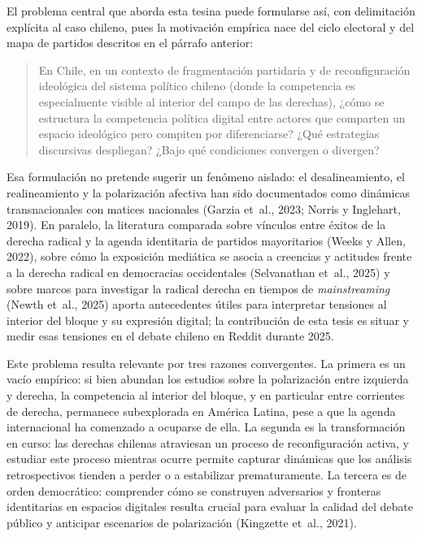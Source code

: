 \documentclass[
  letterpaper,
  numbers=noendperiod,
  fontsize=11pt,
  DIV=12,
  titlepage=false]{scrreprt}
\begin{document}
El problema central que aborda esta tesina puede formularse así, con
delimitación explícita al caso chileno, pues la motivación empírica nace
del ciclo electoral y del mapa de partidos descritos en el párrafo
anterior:

\begin{quote}
En Chile, en un contexto de fragmentación partidaria y de
reconfiguración ideológica del sistema político chileno (donde la
competencia es especialmente visible al interior del campo de las
derechas), ¿cómo se estructura la competencia política digital entre
actores que comparten un espacio ideológico pero compiten por
diferenciarse? ¿Qué estrategias discursivas despliegan? ¿Bajo qué
condiciones convergen o divergen?
\end{quote}

Esa formulación no pretende sugerir un fenómeno aislado: el
desalineamiento, el realineamiento y la polarización afectiva han sido
documentados como dinámicas transnacionales con matices nacionales
(Garzia et~al., 2023; Norris y Inglehart, 2019). En paralelo, la
literatura comparada sobre vínculos entre éxitos de la derecha radical y
la agenda identitaria de partidos mayoritarios (Weeks y Allen, 2022),
sobre cómo la exposición mediática se asocia a creencias y actitudes
frente a la derecha radical en democracias occidentales (Selvanathan
et~al., 2025) y sobre marcos para investigar la radical derecha en
tiempos de \emph{mainstreaming} (Newth et~al., 2025) aporta antecedentes
útiles para interpretar tensiones al interior del bloque y su expresión
digital; la contribución de esta tesis es situar y medir esas tensiones
en el debate chileno en Reddit durante 2025.

Este problema resulta relevante por tres razones convergentes. La
primera es un vacío empírico: si bien abundan los estudios sobre la
polarización entre izquierda y derecha, la competencia al interior del
bloque, y en particular entre corrientes de derecha, permanece
subexplorada en América Latina, pese a que la agenda internacional ha
comenzado a ocuparse de ella. La segunda es la transformación en curso:
las derechas chilenas atraviesan un proceso de reconfiguración activa, y
estudiar este proceso mientras ocurre permite capturar dinámicas que los
análisis retrospectivos tienden a perder o a estabilizar prematuramente.
La tercera es de orden democrático: comprender cómo se construyen
adversarios y fronteras identitarias en espacios digitales resulta
crucial para evaluar la calidad del debate público y anticipar
escenarios de polarización (Kingzette et~al., 2021).
\end{document}
